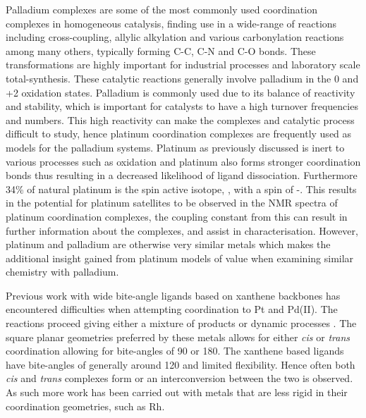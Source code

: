 Palladium complexes are some of the most commonly used coordination complexes in homogeneous catalysis, finding use in a wide-range of reactions including cross-coupling, allylic alkylation and various carbonylation reactions among many others, typically forming C-C, C-N and C-O bonds.  These transformations are highly important for industrial processes and laboratory scale total-synthesis.  These catalytic reactions generally involve palladium in the 0 and +2 oxidation states.  Palladium is commonly used due to its balance of reactivity and stability, which is important for catalysts to have a high turnover frequencies and numbers.  This high reactivity can make the complexes and catalytic process difficult to study, hence platinum coordination complexes are frequently used as models for the palladium systems.  Platinum as previously discussed is inert to various processes such as oxidation and platinum also forms stronger coordination bonds thus resulting in a decreased likelihood of ligand dissociation.  Furthermore 34\% of natural platinum is the spin active isotope, \Pt{}, with a spin of -.  This results in the potential for platinum satellites to be observed in the NMR spectra of platinum coordination complexes, the coupling constant from this can result in further information about the complexes, and assist in characterisation.  However, platinum and palladium are otherwise very similar metals which makes the additional insight gained from platinum models of value when examining similar chemistry with palladium.  



Previous work with wide bite-angle ligands based on xanthene backbones has encountered difficulties when attempting coordination to Pt and Pd(II).  The reactions proceed giving either a mixture of products\cite{Malaise2006, Veen200s0b} or dynamic processes \cite{Veen2000b}.  The square planar geometries preferred by these metals allows for either \emph{cis} or \emph{trans} coordination allowing for bite-angles of 90 or 180\degrees{}.  The xanthene based ligands have bite-angles of generally around 120\degrees{} and limited flexibility.  Hence often both \emph{cis} and \emph{trans} complexes form or an interconversion between the two is observed.  As such more work has been carried out with metals that are less rigid in their coordination geometries, such as Rh.  

